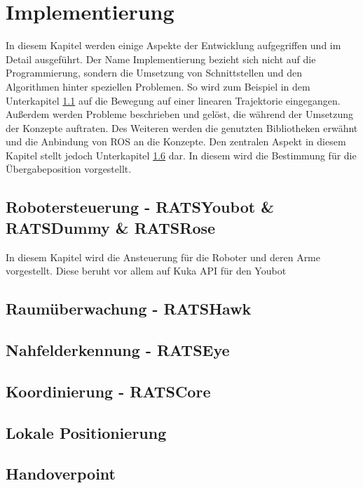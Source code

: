 \section{Implementierung}
\label{sec:impl}

In diesem Kapitel werden einige Aspekte der Entwicklung aufgegriffen und im Detail ausgeführt. Der Name Implementierung bezieht sich nicht auf die Programmierung, sondern die Umsetzung von Schnittstellen und den Algorithmen hinter speziellen Problemen. So wird zum Beispiel in dem Unterkapitel \ref{sec:impl-rs} auf die Bewegung auf einer linearen Trajektorie eingegangen. Außerdem werden Probleme beschrieben und gelöst, die während der Umsetzung der Konzepte auftraten. Des Weiteren werden die genutzten Bibliotheken erwähnt und die Anbindung von ROS an die Konzepte. Den zentralen Aspekt in diesem Kapitel stellt jedoch Unterkapitel \ref{sec:impl-hop} dar. In diesem wird die Bestimmung für die Übergabeposition vorgestellt.

\subsection{Robotersteuerung - RATSYoubot \& RATSDummy \& RATSRose}
\label{sec:impl-rs}
In diesem Kapitel wird die Ansteuerung für die Roboter und deren Arme vorgestellt. Diese beruht vor allem auf Kuka API für den Youbot

\subsection{Raumüberwachung - RATSHawk}
\subsection{Nahfelderkennung - RATSEye}
\subsection{Koordinierung - RATSCore}
\subsection{Lokale Positionierung}
\subsection{Handoverpoint}
\label{sec:impl-hop}
